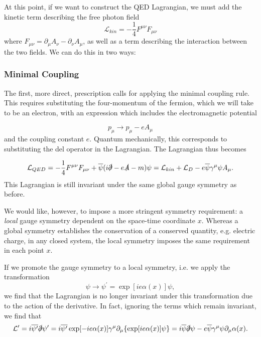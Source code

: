 \documentclass[10pt,a4paper]{book}
\begin{document}
At this point, if we want to construct the QED Lagrangian, we must add the kinetic term describing the free photon field
\begin{equation}
\mathcal{L}_{kin} = -\frac{1}{4}F^{\mu\nu}F_{\mu\nu}
\label{kinetic term}
\end{equation}
where $F_{\mu\nu} = \partial_\mu A_\nu - \partial_\nu A_\mu$, as well as a term describing the interaction between the two fields. We can do this in two ways: 

\subsubsection{Minimal Coupling}

The first, more direct, prescription calls for applying the minimal coupling rule. This requires substituting the four-momentum of the fermion, which we will take to be an electron, with an expression which includes the electromagnetic potential

\begin{equation}
p_\mu \rightarrow p_\mu - eA_\mu
\end{equation}
and the coupling constant $e$. Quantum mechanically, this corresponds to substituting the del operator in the Lagrangian. The Lagrangian thus becomes

\begin{equation}
\label{QED lagrangian}
\mathcal{L}_{QED} = -\frac{1}{4}F^{\mu\nu}F_{\mu\nu} + \overline{\psi}(i\slashed{\partial} - e\slashed{A} - m)\psi = \mathcal{L}_{kin} + \mathcal{L}_D - e\overline{\psi}\gamma^\mu \psi A_\mu.
\end{equation}
This Lagrangian is still invariant under the same global gauge symmetry as before. 

We would like, however, to impose a more stringent symmetry requirement: a \emph{local} gauge symmetry dependent on the space-time coordinate $x$. Whereas a global symmetry establishes the conservation of a conserved quantity, e.g. electric charge, in any closed system, the local symmetry imposes the same requirement in each point $x$. 

If we promote the gauge symmetry to a local symmetry, i.e. we apply the transformation 
\begin{equation}
\psi \rightarrow \psi^\prime = \exp[ie\alpha(x)]\psi,
\label{fermi-field transformation}
\end{equation} 
we find that the Lagrangian is no longer invariant under this transformation due to the action of the derivative. In fact, ignoring the terms which remain invariant, we find that
\begin{equation}
\mathcal{L}^\prime = i\overline{\psi^\prime} \slashed{\partial} \psi^\prime = i\overline{\psi^\prime} \exp[-ie\alpha(x)] \gamma^\mu \partial_\mu \lbrace \exp[ie\alpha(x)]\psi \rbrace = i\overline{\psi}\slashed{\partial}\psi - e\overline{\psi}\gamma^\mu\psi\partial_\mu\alpha(x).
\label{local gauge}
\end{equation}
\end{document}
